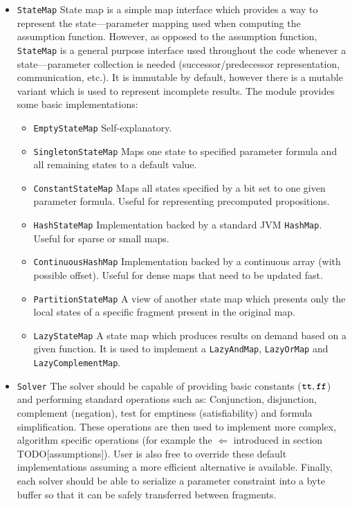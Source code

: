 \begin{itemize}
	\item \texttt{StateMap} State map is a simple map interface which provides a way to represent the state—parameter mapping used when computing the assumption function. However, as opposed to the assumption function, \texttt{StateMap} is a general purpose interface used throughout the code whenever a state—parameter collection is needed (successor/predecessor representation, communication, etc.). It is immutable by default, however there is a mutable variant which is used to represent incomplete results. The module provides some basic implementations:
	
	\begin{itemize}
		\item \texttt{EmptyStateMap} Self-explanatory.
		\item \texttt{SingletonStateMap} Maps one state to specified parameter formula and all remaining states to a default value.
		\item \texttt{ConstantStateMap} Maps all states specified by a bit set to one given parameter formula. Useful for representing precomputed propositions.
		\item \texttt{HashStateMap} Implementation backed by a standard JVM \texttt{HashMap}. Useful for sparse or small maps.
		\item \texttt{ContinuousHashMap} Implementation backed by a continuous array (with possible offset). Useful for dense maps that need to be updated fast.
		\item \texttt{PartitionStateMap} A view of another state map which presents only the local states of a specific fragment present in the original map.
		\item \texttt{LazyStateMap} A state map which produces results on demand based on a given function. It is used to implement a \texttt{LazyAndMap}, \texttt{LazyOrMap} and \texttt{LazyComplementMap}.
	\end{itemize}
	
	\item \texttt{Solver} The solver should be capable of providing basic constants ($\texttt{tt}, \texttt{ff}$) and performing standard operations such as: Conjunction, disjunction, complement (negation), test for emptiness (satisfiability) and formula simplification. These operations are then used to implement more complex, algorithm specific operations (for example the $\Leftarrow$ introduced in section TODO[assumptions]). User is also free to override these default implementations assuming a more efficient alternative is available. Finally, each solver should be able to serialize a parameter constraint into a byte buffer so that it can be safely transferred between fragments.
	

\end{itemize}

